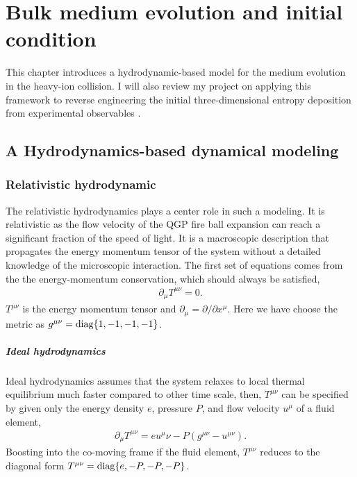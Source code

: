 \chapter{Bulk medium evolution and initial condition}
\label{chapter:simulation}
This chapter introduces a hydrodynamic-based model for the medium evolution in the heavy-ion collision.
I will also review my project on applying this framework to reverse engineering the initial three-dimensional entropy deposition from experimental observables \cite{PhysRevC.96.044912}.

\section{A Hydrodynamics-based dynamical modeling}
\subsection{Relativistic hydrodynamic}
The relativistic hydrodynamics plays a center role in such a modeling.
It is relativistic as the flow velocity of the QGP fire ball expansion can reach a significant fraction of the speed of light.
It is a macroscopic description that propagates the energy momentum tensor of the system without a detailed knowledge of the microscopic interaction.
The first set of equations comes from the the energy-momentum conservation, which should always be satisfied,
\begin{eqnarray}\label{eq:hydro:0-4}
\partial_\mu T^{\mu\nu} = 0.
\end{eqnarray}
$T^{\mu\nu}$ is the energy momentum tensor and $\partial_\mu = \partial/\partial x^\mu$. 
Here we have choose the metric as $g^{\mu\nu} = \operatorname{diag}\{1, -1, -1, -1\}$.

\paragraph{Ideal hydrodynamics} Ideal hydrodynamics assumes that the system relaxes to local thermal equilibrium much faster compared to other time scale, then, $T^{\mu\nu}$ can be specified by given only the energy density $e$, pressure $P$, and flow velocity $u^\mu$ of a fluid element,
\begin{eqnarray}
\partial_\mu T^{\mu\nu} = e u^\mu \nu - P (g^{\mu\nu}-u^{\mu\nu}).
\end{eqnarray}
Boosting into the co-moving frame if the fluid element, $T^{\mu\nu}$ reduces to the diagonal form $T^{\mu\nu} = \operatorname{diag}\{e, -P, -P, -P\}$.

